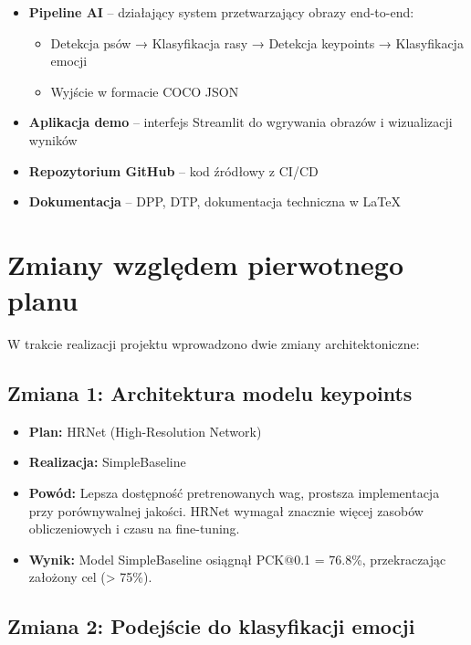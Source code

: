 \documentclass[12pt,a4paper]{article}
\begin{document}
\begin{itemize}
    \item \textbf{Pipeline AI} -- działający system przetwarzający obrazy end-to-end:
    \begin{itemize}
        \item Detekcja psów → Klasyfikacja rasy → Detekcja keypoints → Klasyfikacja emocji
        \item Wyjście w formacie COCO JSON
    \end{itemize}
    \item \textbf{Aplikacja demo} -- interfejs Streamlit do wgrywania obrazów i wizualizacji wyników
    \item \textbf{Repozytorium GitHub} -- kod źródłowy z CI/CD
    \item \textbf{Dokumentacja} -- DPP, DTP, dokumentacja techniczna w LaTeX
\end{itemize}

\section{Zmiany względem pierwotnego planu}

W trakcie realizacji projektu wprowadzono dwie zmiany architektoniczne:

\subsection{Zmiana 1: Architektura modelu keypoints}

\begin{itemize}
    \item \textbf{Plan:} HRNet (High-Resolution Network)
    \item \textbf{Realizacja:} SimpleBaseline
    \item \textbf{Powód:} Lepsza dostępność pretrenowanych wag, prostsza implementacja przy porównywalnej jakości. HRNet wymagał znacznie więcej zasobów obliczeniowych i czasu na fine-tuning.
    \item \textbf{Wynik:} Model SimpleBaseline osiągnął PCK@0.1 = 76.8\%, przekraczając założony cel (> 75\%).
\end{itemize}

\subsection{Zmiana 2: Podejście do klasyfikacji emocji}
\end{document}
